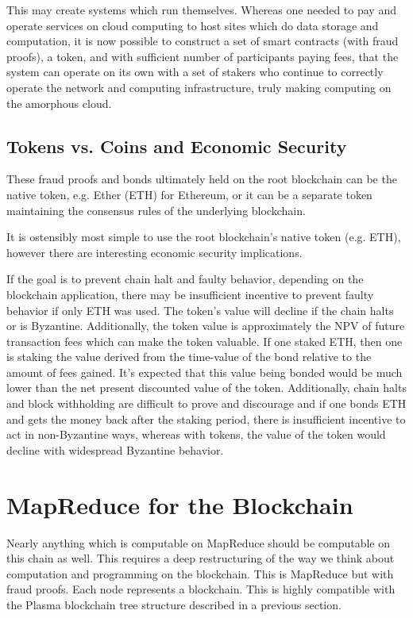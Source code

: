 \documentclass[letterpaper, 11pt]{article}
\begin{document}
This may create systems which run themselves. Whereas one needed to pay and
operate services on cloud computing to host sites which do data storage and
computation, it is now possible to construct a set of smart contracts (with
fraud proofs), a token, and with sufficient number of participants paying fees,
that the system can operate on its own with a set of stakers who continue to
correctly operate the network and computing infrastructure, truly making
computing on the amorphous cloud.

\subsection{Tokens vs. Coins and Economic Security}

These fraud proofs and bonds ultimately held on the root blockchain can be the
native token, e.g. Ether (ETH) for Ethereum, or it can be a separate token
maintaining the consensus rules of the underlying blockchain.

It is ostensibly most simple to use the root blockchain's native token (e.g.
ETH), however there are interesting economic security implications.

If the goal is to prevent chain halt and faulty behavior, depending on the
blockchain application, there may be insufficient incentive to prevent faulty
behavior if only ETH was used. The token's value will decline if the chain
halts or is Byzantine. Additionally, the token value is approximately the NPV of
future transaction fees which can make the token valuable. If one staked ETH,
then one is staking the value derived from the time-value of the bond relative
to the amount of fees gained. It's expected that this value being bonded would
be much lower than the net present discounted value of the token. Additionally,
chain halts and block withholding are difficult to prove and discourage and if
one bonds ETH and gets the money back after the staking period, there is
insufficient incentive to act in non-Byzantine ways, whereas with tokens, the
value of the token would decline with widespread Byzantine behavior.

\section{MapReduce for the Blockchain}

Nearly anything which is computable on MapReduce should be computable on this
chain as well. This requires a deep restructuring of the way we think about
computation and programming on the blockchain. This is MapReduce but with fraud
proofs. Each node represents a blockchain. This is highly compatible with the
Plasma blockchain tree structure described in a previous section.
\end{document}
